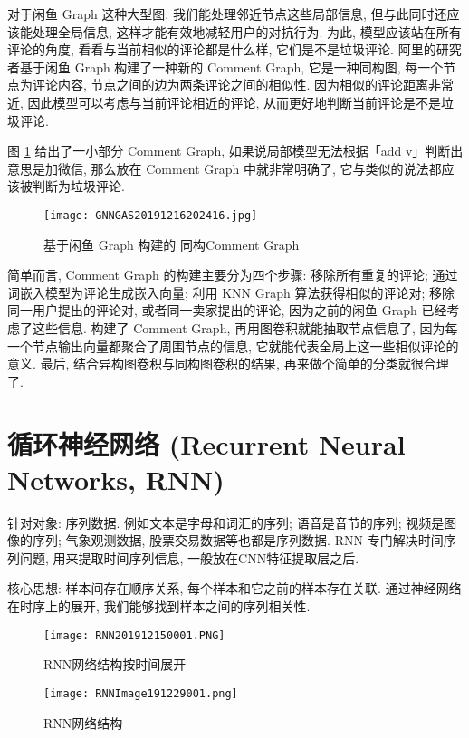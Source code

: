 对于闲鱼 Graph 这种大型图, 我们能处理邻近节点这些局部信息, 但与此同时还应该能处理全局信息, 这样才能有效地减轻用户的对抗行为.
为此, 模型应该站在所有评论的角度, 看看与当前相似的评论都是什么样, 它们是不是垃圾评论.
阿里的研究者基于闲鱼 Graph 构建了一种新的 Comment Graph, 它是一种同构图, 每一个节点为评论内容, 节点之间的边为两条评论之间的相似性.
因为相似的评论距离非常近, 因此模型可以考虑与当前评论相近的评论, 从而更好地判断当前评论是不是垃圾评论.

图 \ref{GNNGAS20191216202416} 给出了一小部分 Comment Graph, 如果说局部模型无法根据「add v」判断出意思是加微信, 那么放在 Comment Graph 中就非常明确了, 它与类似的说法都应该被判断为垃圾评论.
\begin{figure}[H]
    \centering
    \texttt{[image: GNNGAS20191216202416.jpg]}
    \caption{基于闲鱼 Graph 构建的 同构Comment Graph}
    \label{GNNGAS20191216202416}
    \vspace{-0.4cm}
\end{figure}
简单而言, Comment Graph 的构建主要分为四个步骤: 移除所有重复的评论;
通过词嵌入模型为评论生成嵌入向量; 利用 KNN Graph 算法获得相似的评论对;
移除同一用户提出的评论对, 或者同一卖家提出的评论, 因为之前的闲鱼 Graph 已经考虑了这些信息.
构建了 Comment Graph, 再用图卷积就能抽取节点信息了, 因为每一个节点输出向量都聚合了周围节点的信息, 它就能代表全局上这一些相似评论的意义.
最后, 结合异构图卷积与同构图卷积的结果, 再来做个简单的分类就很合理了.
\section{循环神经网络 (Recurrent Neural Networks, RNN)}
针对对象: 序列数据. 例如文本是字母和词汇的序列; 语音是音节的序列; 视频是图像的序列;
气象观测数据, 股票交易数据等也都是序列数据. RNN 专门解决时间序列问题, 用来提取时间序列信息, 一般放在CNN特征提取层之后.

核心思想: 样本间存在顺序关系, 每个样本和它之前的样本存在关联.
通过神经网络在时序上的展开, 我们能够找到样本之间的序列相关性.
\begin{figure}[H]
    \centering
    \texttt{[image: RNN201912150001.PNG]}
    \caption{RNN网络结构按时间展开}
    \label{RNN201912150001}
    \vspace{-0.4cm}
\end{figure}
\begin{figure}[H]
    \centering
    \texttt{[image: RNNImage191229001.png]}
    \caption{RNN网络结构}
    \label{RNNImage191229001}
    \vspace{-0.4cm}
\end{figure}

